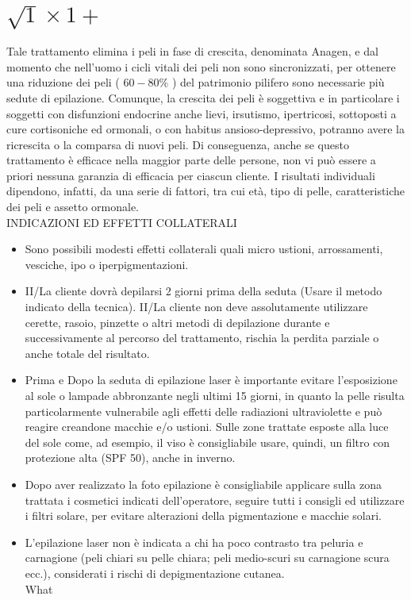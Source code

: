 \documentclass[10pt]{article}
\begin{document}
\section{$\sqrt{1} \times 1+$}
Tale trattamento elimina i peli in fase di crescita, denominata Anagen, e dal momento che nell'uomo i cicli vitali dei peli non sono sincronizzati, per ottenere una riduzione dei peli ( $60-80 \%$ ) del patrimonio pilifero sono necessarie più sedute di epilazione. Comunque, la crescita dei peli è soggettiva e in particolare i soggetti con disfunzioni endocrine anche lievi, irsutismo, ipertricosi, sottoposti a cure cortisoniche ed ormonali, o con habitus ansioso-depressivo, potranno avere la ricrescita o la comparsa di nuovi peli. Di conseguenza, anche se questo trattamento è efficace nella maggior parte delle persone, non vi può essere a priori nessuna garanzia di efficacia per ciascun cliente. I risultati individuali dipendono, infatti, da una serie di fattori, tra cui età, tipo di pelle, caratteristiche dei peli e assetto ormonale.\\
INDICAZIONI ED EFFETTI COLLATERALI

\begin{itemize}
  \item Sono possibili modesti effetti collaterali quali micro ustioni, arrossamenti, vesciche, ipo o iperpigmentazioni.
  \item II/La cliente dovrà depilarsi 2 giorni prima della seduta (Usare il metodo indicato della tecnica). II/La cliente non deve assolutamente utilizzare cerette, rasoio, pinzette o altri metodi di depilazione durante e successivamente al percorso del trattamento, rischia la perdita parziale o anche totale del risultato.
  \item Prima e Dopo la seduta di epilazione laser è importante evitare l'esposizione al sole o lampade abbronzante negli ultimi 15 giorni, in quanto la pelle risulta particolarmente vulnerabile agli effetti delle radiazioni ultraviolette e può reagire creandone macchie e/o ustioni. Sulle zone trattate esposte alla luce del sole come, ad esempio, il viso è consigliabile usare, quindi, un filtro con protezione alta (SPF 50), anche in inverno.
  \item Dopo aver realizzato la foto epilazione è consigliabile applicare sulla zona trattata i cosmetici indicati dell'operatore, seguire tutti i consigli ed utilizzare i filtri solare, per evitare alterazioni della pigmentazione e macchie solari.
  \item L'epilazione laser non è indicata a chi ha poco contrasto tra peluria e carnagione (peli chiari su pelle chiara; peli medio-scuri su carnagione scura ecc.), considerati i rischi di depigmentazione cutanea.\\
What
\end{itemize}
\end{document}
